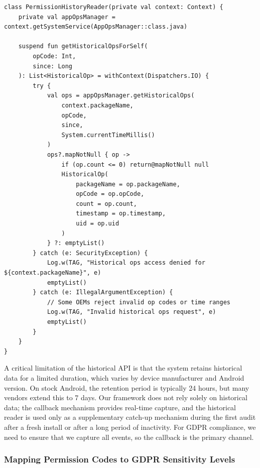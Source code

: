\begin{lstlisting}[caption=Historical permission reader with fallback logic and exception handling]
class PermissionHistoryReader(private val context: Context) {
    private val appOpsManager = context.getSystemService(AppOpsManager::class.java)
    
    suspend fun getHistoricalOpsForSelf(
        opCode: Int, 
        since: Long
    ): List<HistoricalOp> = withContext(Dispatchers.IO) {
        try {
            val ops = appOpsManager.getHistoricalOps(
                context.packageName,
                opCode,
                since,
                System.currentTimeMillis()
            )
            ops?.mapNotNull { op ->
                if (op.count <= 0) return@mapNotNull null
                HistoricalOp(
                    packageName = op.packageName,
                    opCode = op.opCode,
                    count = op.count,
                    timestamp = op.timestamp,
                    uid = op.uid
                )
            } ?: emptyList()
        } catch (e: SecurityException) {
            Log.w(TAG, "Historical ops access denied for ${context.packageName}", e)
            emptyList()
        } catch (e: IllegalArgumentException) {
            // Some OEMs reject invalid op codes or time ranges
            Log.w(TAG, "Invalid historical ops request", e)
            emptyList()
        }
    }
}
\end{lstlisting}

A critical limitation of the historical API is that the system retains historical data for a limited duration, which varies by device manufacturer and Android version. On stock Android, the retention period is typically 24 hours, but many vendors extend this to 7 days. Our framework does not rely solely on historical data; the callback mechanism provides real-time capture, and the historical reader is used only as a supplementary catch-up mechanism during the first audit after a fresh install or after a long period of inactivity. For GDPR compliance, we need to ensure that we capture all events, so the callback is the primary channel.

\subsubsection{Mapping Permission Codes to GDPR Sensitivity Levels}

